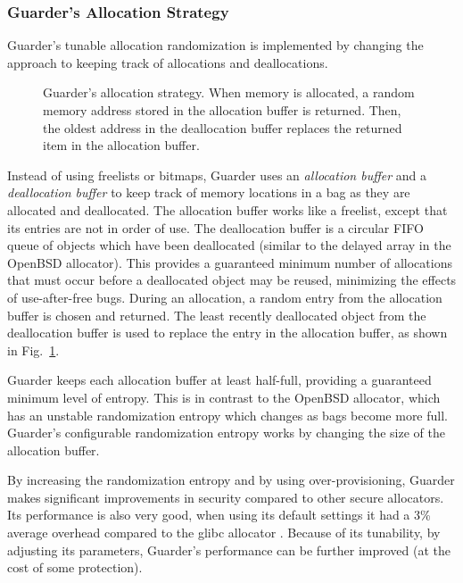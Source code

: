 \documentclass[conference]{IEEEtran}
\begin{document}
\subsubsection{Guarder's Allocation Strategy}

Guarder's tunable allocation randomization is implemented by changing the approach to keeping track of allocations and deallocations.

\begin{figure}
	\def\svgwidth{3.5in}
	
	\caption{
		Guarder's allocation strategy.
		When memory is allocated, a random memory address stored in the allocation buffer is returned.
		Then, the oldest address in the deallocation buffer replaces the returned item in the allocation buffer.
		\label{fig:guarder_allocation}}
\end{figure}

Instead of using freelists or bitmaps, Guarder uses an \emph{allocation buffer} and a \emph{deallocation buffer} to keep track of memory locations in a bag as they are allocated and deallocated.
The allocation buffer works like a freelist, except that its entries are not in order of use.
The deallocation buffer is a circular FIFO queue of objects which have been deallocated (similar to the delayed array in the OpenBSD allocator).
This provides a guaranteed minimum number of allocations that must occur before a deallocated object may be reused, minimizing the effects of use-after-free bugs.
During an allocation, a random entry from the allocation buffer is chosen and returned.
The least recently deallocated object from the deallocation buffer is used to replace the entry in the allocation buffer, as shown in Fig.~\ref{fig:guarder_allocation}.

Guarder keeps each allocation buffer at least half-full, providing a guaranteed minimum level of entropy.
This is in contrast to the OpenBSD allocator, which has an unstable randomization entropy which changes as bags become more full.
Guarder's configurable randomization entropy works by changing the size of the allocation buffer.

By increasing the randomization entropy and by using over-provisioning, Guarder makes significant improvements in security compared to other secure allocators.
Its performance is also very good, when using its default settings it had a 3\% average overhead compared to the glibc allocator \cite{guarder}.
Because of its tunability, by adjusting its parameters, Guarder's performance can be further improved (at the cost of some protection).
\end{document}
